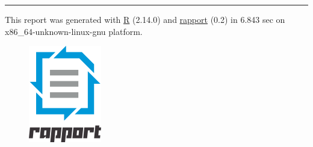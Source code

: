 \documentclass[]{article}
\makeatletter
\def\maxwidth{\ifdim\Gin@nat@width>\linewidth\linewidth
\else\Gin@nat@width\fi}
\let\Oldincludegraphics\includegraphics
\renewcommand{\includegraphics}[1]{\Oldincludegraphics[width=\maxwidth]{#1}}
\makeatother
\begin{document}
\begin{center}\rule{3in}{0.4pt}\end{center}

This report was generated with \href{http://www.r-project.org/}{R}
(2.14.0) and \href{http://al3xa.github.com/rapport/}{rapport} (0.2) in
6.843 sec on x86\_64-unknown-linux-gnu platform.

\begin{figure}[htbp]
\centering
\includegraphics{images/logo.png}
\caption{}
\end{figure}
\end{document}
